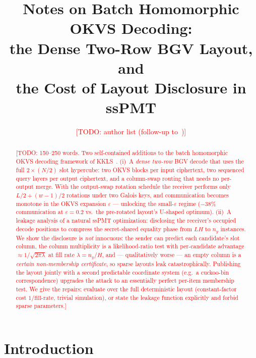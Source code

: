 \documentclass[runningheads]{llncs}
\newcommand{\TODO}[1]{\textcolor{red}{[TODO: #1]}}
\newcommand{\band}{w}                        %
\newcommand{\eps}{\varepsilon}               %
\newcommand{\half}{H}                        %
\begin{document}
%
\title{Notes on Batch Homomorphic OKVS Decoding:\\ the Dense Two-Row BGV Layout, and\\ the Cost of Layout Disclosure in ssPMT}
\author{\TODO{author list (follow-up to~\cite{EPRINT:KwaKwoLeeSon26})}}
\institute{\TODO{institutes}}
%
\maketitle
%
\begin{abstract}
\TODO{150--250 words. Two self-contained additions to the batch homomorphic OKVS
decoding framework of KKLS~\cite{EPRINT:KwaKwoLeeSon26}. (i)~A \emph{dense two-row}
BGV decode that uses the full $2\times(N/2)$ slot hypercube: two OKVS blocks per input
ciphertext, two sequenced query layers per output ciphertext, and a column-swap routing
that needs no per-output merge. With the output-swap rotation schedule the receiver
performs only $L/2+(\band{-}1)/2$ rotations under two Galois keys, and communication
becomes monotone in the OKVS expansion $\eps$ --- unlocking the small-$\eps$ regime
($-38\%$ communication at $\eps=0.2$ vs.\ the pre-rotated layout's U-shaped optimum).
(ii)~A leakage analysis of a natural ssPMT optimization: disclosing the receiver's
occupied decode positions to compress the secret-shared equality phase from $L\half$ to
$n_y$ instances. We show the disclosure is \emph{not} innocuous: the sender can predict
each candidate's slot column, the column multiplicity is a likelihood-ratio test with
per-candidate advantage $\approx1/\sqrt{2\pi\lambda}$ at fill rate $\lambda=n_y/\half$,
and --- qualitatively worse --- an empty column is a \emph{certain non-membership
certificate}, so sparse layouts leak catastrophically. Publishing the layout jointly
with a second predictable coordinate system (e.g.\ a cuckoo-bin correspondence) upgrades
the attack to an essentially perfect per-item membership test. We give the repairs:
evaluate over the full deterministic layout (constant-factor cost $1/\text{fill-rate}$,
trivial simulation), or state the leakage function explicitly and forbid sparse
parameters.}

\end{abstract}
%
\section{Introduction}
\label{sec:intro}
\end{document}
